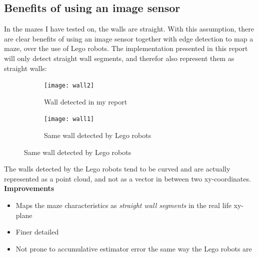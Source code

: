 \subsection{Benefits of using an image sensor}
In the mazes I have tested on, the walls are straight. With this assumption, there are clear benefits of using an image sensor together with edge detection to map a maze, over the use of Lego robots. The implementation presented in this report will only detect straight wall segments, and therefor also represent them as straight walls:
\begin{figure}[H]
\begin{subfigure}{.5\textwidth}
  \centering
  \texttt{[image: wall2]}
  \caption{Wall detected in my report}
\end{subfigure}
\begin{subfigure}{.5\textwidth}
  \centering
  \texttt{[image: wall1]}
  \caption{Same wall detected by Lego robots}
\end{subfigure}
\end{figure}

The walls detected by the Lego robots tend to be curved and are actually represented as a point cloud, and not as a vector in between two xy-coordinates.\\

\textbf{Improvements}
\begin{itemize}
\item Maps the maze characteristics as \emph{straight wall segments} in the real life xy-plane
\item Finer detailed
\item Not prone to accumulative estimator error the same way the Lego robots are
\end{itemize}













